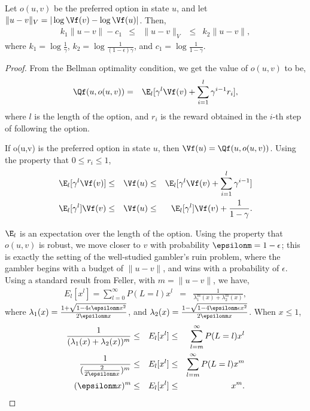 \begin{lemma}
    \label{lm:distance}
    Let $o(u,v)$ be the preferred option in state $u$, and let $\|u -
    v\|_V = |\log \Vf(v) - \log \Vf(u)|$. Then, 
    \begin{align*}
        k_1 \|u - v\| - c_1 & \le & \|u - v\|_V & \le & k_2 \|u - v\|, 
    \end{align*}
    \noindent
    where $k_1 = \log \frac{1}{\gamma} $, $k_2 = \log
    \frac{1}{(1-\epsilon)\gamma}$, and $c_1 = \log
    \frac{1}{1-\gamma}$.
\end{lemma}
\begin{proof}
    From the Bellman optimality condition, we get the value of $o(u,v)$ to be,
    \begin{eqnarray*}
        \Qf(u, o(u,v)) &=& \E_{l}[ \gamma^{l} \Vf(v) + \sum_{i=1}^{l} \gamma^{i-1} r_i ],
    \end{eqnarray*}
    \noindent
    where $l$ is the length of the option, and $r_i$ is the reward
    obtained in the $i$-th step of following the option. 
    
    If o(u,v) is the preferred option in state $u$, then $\Vf(u) =
    \Qf(u, o(u,v))$.  Using the property that $0 \le r_i \le 1$,
    \begin{align}
        \E_{l}[ \gamma^{l} \Vf(v) ] &\le& \Vf(u) &\le& \E_{l}[ \gamma^{l} \Vf(v) + \sum_{i=1}^{l} \gamma^{i-1}] \nonumber \\
        \E_{l}[ \gamma^{l} ] \Vf(v) &\le& \Vf(u) &\le& \E_{l}[ \gamma^{l} ] \Vf(v) + \frac{1}{1 - \gamma}. \label{eq:v-bound}
    \end{align}

    $\E_{l}$ is an expectation over the length of the option. Using
    the property that $o(u,v)$ is robust, we move closer to $v$ with
    probability $\epsilonm = 1 - \epsilon$; this is exactly the setting of the
    well-studied gambler's ruin problem, where the gambler begins with
    a budget of $\|u-v\|$, and wins with a probability of $\epsilon$.
    Using a standard result from Feller\cite{Feller1968}, with $m
    = \|u-v\|$, we have,
    \begin{eqnarray*}
        E_l[x^l] = \sum_{l=0}^{\infty} P(L = l) x^{l} &=& \frac{1}{\lambda_1^m( x ) + \lambda_2^m( x )},
    \end{eqnarray*}
    \noindent
    where $\lambda_1(x) = \frac{1 + \sqrt{1 - 4\epsilon\epsilonm
    x^2}}{2\epsilonm x}$, and $\lambda_2(x) = \frac{1 - \sqrt{1
    - 4\epsilonm\epsilon x^2}}{2\epsilonm x}$. When $x \le 1$, 
    \begin{align*}
        \frac{1}{ (\lambda_1( x ) + \lambda_2( x ) )^{m} }  &\le&  E_l[x^l] &\le& \sum_{l=m}^{\infty} P(L = l) x^{l} \\
        \frac{1}{(\frac{2}{2\epsilonm x})^m}  &\le&  E_l[x^l] &\le& \sum_{l=m}^{\infty} P(L = l) x^{m} \\
        (\epsilonm x)^m  &\le&  E_l[x^l] &\le& x^m.
    \end{align*}


\end{proof}
